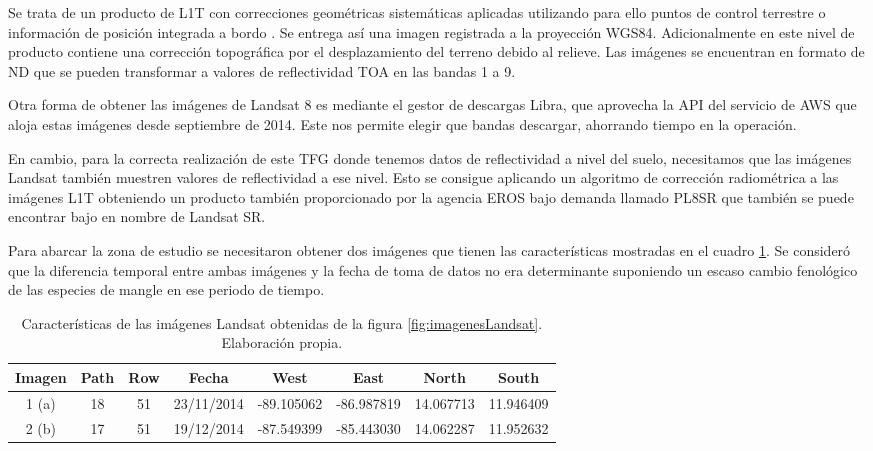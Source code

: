 Se trata de un producto de \ac{L1T} con correcciones geométricas sistemáticas aplicadas utilizando para ello puntos de control terrestre o información de posición integrada a bordo \citep{Ariza2013}. Se entrega así una imagen registrada a la proyección WGS84. Adicionalmente en este nivel de producto contiene una corrección topográfica por el desplazamiento del terreno debido al relieve. Las imágenes se encuentran en formato de \ac{ND} que se pueden transformar a valores de reflectividad \ac{TOA} en las bandas 1 a 9.\Sep

Otra forma de obtener las imágenes de Landsat 8 es mediante el gestor de descargas Libra, que aprovecha la API del servicio de \ac{AWS} que aloja estas imágenes desde septiembre de 2014. Este nos permite elegir que bandas descargar, ahorrando tiempo en la operación.\Sep

En cambio, para la correcta realización de este \ac{TFG} donde tenemos datos de reflectividad a nivel del suelo, necesitamos que las imágenes Landsat también muestren valores de reflectividad a ese nivel. Esto se consigue aplicando un algoritmo de corrección radiométrica a las imágenes \ac{L1T} obteniendo un producto también proporcionado por la agencia \ac{EROS} bajo demanda llamado \ac{PL8SR} \citep{USGS2015} que también se puede encontrar bajo en nombre de Landsat SR.\Sep

Para abarcar la zona de estudio se necesitaron obtener dos imágenes que tienen las características mostradas en el cuadro \ref{tab:imagenes}. Se consideró que la diferencia temporal entre ambas imágenes y la fecha de toma de datos no era determinante suponiendo un escaso cambio fenológico de las especies de mangle en ese periodo de tiempo.\Sep

\begin{table}[ht]
	\centering
	\begin{tabular}{@{}cccccccc@{}}
	\toprule[0.4mm]
	Imagen & Path & Row & Fecha & West & East & North & South \\
	\midrule
	1 (a) & 18 & 51 & 23/11/2014 & -89.105062 & -86.987819 & 14.067713 & 11.946409 \\
	2 (b) & 17 & 51 & 19/12/2014 & -87.549399 & -85.443030 & 14.062287 & 11.952632 \\
	\bottomrule[0.4mm]
	\end{tabular}
	\caption[Caracerísticas de las imágenes Landsat]{Características de las imágenes Landsat obtenidas de la figura \ref{fig:imagenesLandsat}. Elaboración propia.}
	\label{tab:imagenes}
\end{table}

